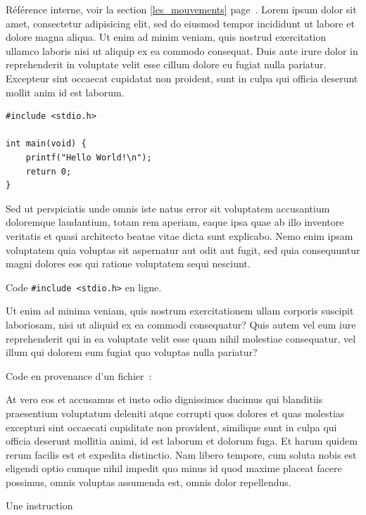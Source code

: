 Référence interne, voir la section \ref{les_mouvements} page~\pageref{les_mouvements}. %
Lorem ipsum dolor sit amet, consectetur adipisicing elit, sed do eiusmod tempor incididunt ut labore et dolore magna aliqua. Ut enim ad minim veniam, quis nostrud exercitation ullamco laboris nisi ut aliquip ex ea commodo consequat. Duis aute irure dolor in reprehenderit in voluptate velit esse cillum dolore eu fugiat nulla pariatur. Excepteur sint occaecat cupidatat non proident, sunt in culpa qui officia deserunt mollit anim id est laborum.

\begin{lstlisting}[style=sourceC]
#include <stdio.h>

int main(void) {
	printf("Hello World!\n");
	return 0;
}
\end{lstlisting}		

 
Sed ut perspiciatis unde omnis iste natus error sit voluptatem accusantium doloremque laudantium, totam rem aperiam, eaque ipsa quae ab illo inventore veritatis et quasi architecto beatae vitae dicta sunt explicabo. Nemo enim ipsam voluptatem quia voluptas sit aspernatur aut odit aut fugit, sed quia consequuntur magni dolores eos qui ratione voluptatem sequi nesciunt. 

Code \lstinline[style=sourceC]!#include <stdio.h>! en ligne.


Ut enim ad minima veniam, quis nostrum exercitationem ullam corporis suscipit laboriosam, nisi ut aliquid ex ea commodi consequatur? Quis autem vel eum iure reprehenderit qui in ea voluptate velit esse quam nihil molestiae consequatur, vel illum qui dolorem eum fugiat quo voluptas nulla pariatur?

Code en provenance d'un fichier~:

 

At vero eos et accusamus et iusto odio dignissimos ducimus qui blanditiis praesentium voluptatum deleniti atque corrupti quos dolores et quas molestias excepturi sint occaecati cupiditate non provident, similique sunt in culpa qui officia deserunt mollitia animi, id est laborum et dolorum fuga. Et harum quidem rerum facilis est et expedita distinctio. Nam libero tempore, cum soluta nobis est eligendi optio cumque nihil impedit quo minus id quod maxime placeat facere possimus, omnis voluptas assumenda est, omnis dolor repellendus. 

\begin{algorithm}[H]	
	Une instruction \\
	
\end{algorithm}



